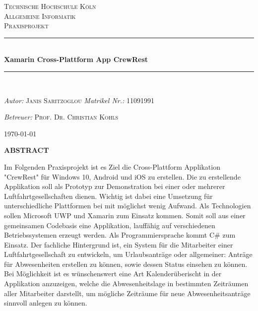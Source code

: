 \begin{titlepage}
\newcommand{\HRule}{\rule{\linewidth}{0.5mm}}
\center
\textsc{\LARGE Technische Hochschule Köln} \\[1.5cm]
\textsc{\Large Allgemeine Informatik} \\[0.5cm]
\textsc{\large Praxisprojekt} \\
\HRule  \\[0.4cm]
{ \huge \bfseries Xamarin Cross-Plattform App CrewRest} \\[0.4cm]
\HRule  \\[1.5cm]
\vfill
\begin{minipage}[t]{0.4\textwidth}
    \begin{flushleft} \large
        \emph{Autor:} \newline
        \textsc{Janis Saritzoglou}
        \newline
        \emph{Matrikel Nr.:}
        \textsc{11091991}
    \end{flushleft}
\end{minipage}
\hfill
\begin{minipage}[t]{0.5\textwidth}
    \begin{flushright} \large
        \begin{flushleft}
            \emph{Betreuer:} \newline
            \textsc{Prof. Dr. Christian Kohls}
    \end{flushleft}
    \end{flushright}
\end{minipage}
\vfill
{\large \today}
\end{titlepage}
\begin{center} \textbf{\uppercase{abstract}} \end{center}
Im Folgenden Praxisprojekt ist es Ziel die Cross-Plattform Applikation "CrewRest" für Windows 10, Android und iOS zu erstellen. Die zu erstellende Applikation soll als Prototyp zur Demonstration bei einer oder mehrerer Luftfahrtgesellschaften dienen. Wichtig ist dabei eine Umsetzung für unterschiedliche Plattformen bei mit möglichst wenig Aufwand. Als Technologien sollen Microsoft UWP und Xamarin zum Einsatz kommen. Somit soll aus einer gemeinsamen Codebasis eine Applikation, lauffähig auf verschiedenen Betriebssystemen erzeugt werden. Als Programmiersprache kommt C\# zum Einsatz. Der fachliche Hintergrund ist, ein System für die Mitarbeiter einer Luftfahrtgesellschaft zu entwickeln, um Urlaubsanträge oder allgemeiner: Anträge für Abwesenheiten erstellen zu können, sowie dessen Status einsehen zu können. Bei Möglichkeit ist es wünschenswert eine Art Kalenderüberischt in der Applikation anzuzeigen, welche die Abwesenheitslage in bestimmten Zeiträumen aller Mitarbeiter darstellt, um mögliche Zeiträume für neue Abwesenheitsanträge sinnvoll anlegen zu können.
